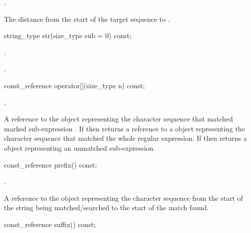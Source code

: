 \begin{itemdescr}
\pnum
\expects
{}.

\pnum
\returns
The distance from the start of the target sequence
to .
\end{itemdescr}

%
\begin{itemdecl}
string_type str(size_type sub = 0) const;
\end{itemdecl}

\begin{itemdescr}
\pnum
\expects
{}.

\pnum
\returns
{}.
\end{itemdescr}

%
\begin{itemdecl}
const_reference operator[](size_type n) const;
\end{itemdecl}

\begin{itemdescr}
\pnum
\expects
{}.

\pnum
\returns
A reference to the  object representing the
character sequence that matched marked sub-expression . If 
then returns a reference to a  object representing the
character sequence that matched the whole regular expression. If
 then returns a  object representing an
unmatched sub-expression.
\end{itemdescr}

%
\begin{itemdecl}
const_reference prefix() const;
\end{itemdecl}

\begin{itemdescr}
\pnum
\expects
{}.

\pnum
\returns
A reference to the  object representing the
character sequence from the start of the string being
matched/searched to the start of the match found.
\end{itemdescr}

%
\begin{itemdecl}
const_reference suffix() const;
\end{itemdecl}

